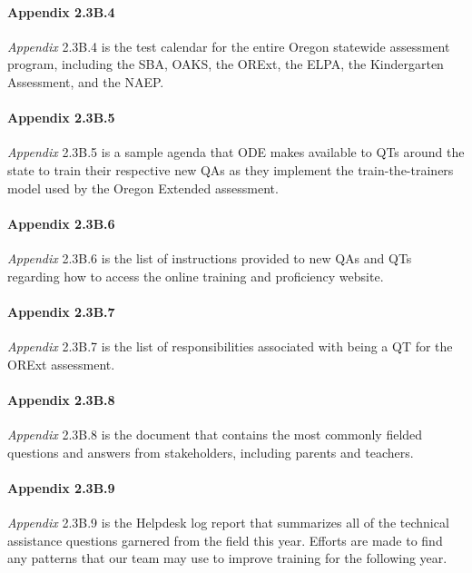 \documentclass[]{article}
\let\oldparagraph\paragraph
\renewcommand{\paragraph}[1]{\oldparagraph{#1}\mbox{}}
\begin{document}
\paragraph{Appendix 2.3B.4}\label{appendix-2.3b.4}

\emph{Appendix} 2.3B.4 is the test calendar for the entire Oregon
statewide assessment program, including the SBA, OAKS, the ORExt, the
ELPA, the Kindergarten Assessment, and the NAEP.

\paragraph{Appendix 2.3B.5}\label{appendix-2.3b.5}

\emph{Appendix} 2.3B.5 is a sample agenda that ODE makes available to
QTs around the state to train their respective new QAs as they implement
the train-the-trainers model used by the Oregon Extended assessment.

\paragraph{Appendix 2.3B.6}\label{appendix-2.3b.6}

\emph{Appendix} 2.3B.6 is the list of instructions provided to new QAs
and QTs regarding how to access the online training and proficiency
website.

\paragraph{Appendix 2.3B.7}\label{appendix-2.3b.7}

\emph{Appendix} 2.3B.7 is the list of responsibilities associated with
being a QT for the ORExt assessment.

\paragraph{Appendix 2.3B.8}\label{appendix-2.3b.8}

\emph{Appendix} 2.3B.8 is the document that contains the most commonly
fielded questions and answers from stakeholders, including parents and
teachers.

\paragraph{Appendix 2.3B.9}\label{appendix-2.3b.9}

\emph{Appendix} 2.3B.9 is the Helpdesk log report that summarizes all of
the technical assistance questions garnered from the field this year.
Efforts are made to find any patterns that our team may use to improve
training for the following year.
\end{document}
